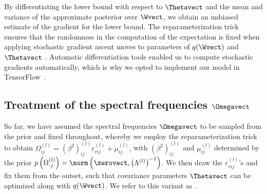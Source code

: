By differentiating the lower bound with respect to $\Thetavect$ and the mean and variance of the approximate posterior over $\Wvect$, we obtain an unbiased estimate of the gradient for the lower bound.
The reparameterization trick ensures that the randomness in the computation of the expectation is fixed when applying stochastic gradient ascent moves to parameters of $q(\Wvect)$ and $\Thetavect$ \citep{Kingma14}.
Automatic differentiation tools enabled us to compute stochastic gradients automatically, which is why we opted to implement our model in TensorFlow~\citep{MartinAbadi15}.

\subsection{Treatment of the spectral frequencies $\Omegavect$}

So far, we have assumed the spectral frequencies $\Omegavect$ to be sampled from the prior and fixed throughout, whereby we employ the reparameterization trick to obtain 
$
\Omega^{(l)}_{ij} = (\beta^2)^{(l)}_{ij} \varepsilon^{(l)}_{rij} + \mu^{(l)}_{ij}\text{,}
$
with $(\beta^2)^{(l)}_{ij}$ and $\mu^{(l)}_{ij}$ determined by the prior $p\left(\Omega^{(l)}_{\cdot j}\right) = \norm\left(\zerovect, \left(\Lambda^{(l)}\right)^{-1} \right)$.
We then draw the $\varepsilon^{(l)}_{rij}$'s and fix them from the outset, such that covariance parameters $\Thetavect$ can be optimized along with $q(\Wvect)$.
We refer to this variant as .

